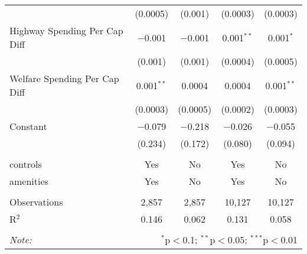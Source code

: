 \begin{table}[!htbp]
\begin{tabular}{@{\extracolsep{5pt}}lcccc}
  & (0.0005) & (0.001) & (0.0003) & (0.0003) \\ 
  Highway Spending Per Cap Diff & $-$0.001 & $-$0.001 & 0.001$^{**}$ & 0.001$^{*}$ \\ 
  & (0.001) & (0.001) & (0.0004) & (0.0005) \\ 
  Welfare Spending Per Cap Diff & 0.001$^{**}$ & 0.0004 & 0.0004 & 0.001$^{**}$ \\ 
  & (0.0003) & (0.0005) & (0.0002) & (0.0003) \\ 
  Constant & $-$0.079 & $-$0.218 & $-$0.026 & $-$0.055 \\ 
  & (0.234) & (0.172) & (0.080) & (0.094) \\ 
 \hline \\[-1.8ex] 
controls & Yes & No & Yes & No \\ 
amenities & Yes & No & Yes & No \\ 
\hline \\[-1.8ex] 
Observations & 2,857 & 2,857 & 10,127 & 10,127 \\ 
R$^{2}$ & 0.146 & 0.062 & 0.131 & 0.058 \\ 
\hline 
\hline \\[-1.8ex] 
\textit{Note:}  & \multicolumn{4}{r}{$^{*}$p$<$0.1; $^{**}$p$<$0.05; $^{***}$p$<$0.01} \\ 
\end{tabular} 
\end{table} 
